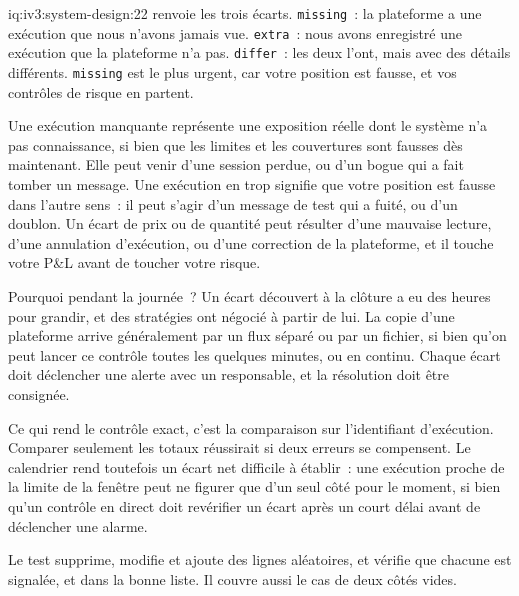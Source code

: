 \begin{solution}{iq:iv3:system-design:22}
 renvoie les trois écarts. \texttt{missing}~: la plateforme a une exécution que nous n'avons jamais vue. \texttt{extra}~: nous avons enregistré une exécution que la plateforme n'a pas. \texttt{differ}~: les deux l'ont, mais avec des détails différents. \texttt{missing} est le plus urgent, car votre position est fausse, et vos contrôles de risque en partent.
\label{lst:iv3:sd:recon}

Une exécution manquante représente une exposition réelle dont le système n'a pas connaissance, si bien que les limites et les couvertures sont fausses dès maintenant. Elle peut venir d'une session perdue, ou d'un bogue qui a fait tomber un message. Une exécution en trop signifie que votre position est fausse dans l'autre sens~: il peut s'agir d'un message de test qui a fuité, ou d'un doublon. Un écart de prix ou de quantité peut résulter d'une mauvaise lecture, d'une annulation d'exécution, ou d'une correction de la plateforme, et il touche votre P\&L avant de toucher votre risque.

Pourquoi pendant la journée~? Un écart découvert à la clôture a eu des heures pour grandir, et des stratégies ont négocié à partir de lui. La copie d'une plateforme arrive généralement par un flux séparé ou par un fichier, si bien qu'on peut lancer ce contrôle toutes les quelques minutes, ou en continu. Chaque écart doit déclencher une alerte avec un responsable, et la résolution doit être consignée.

Ce qui rend le contrôle exact, c'est la comparaison sur l'identifiant d'exécution. Comparer seulement les totaux réussirait si deux erreurs se compensent. Le calendrier rend toutefois un écart net difficile à établir~: une exécution proche de la limite de la fenêtre peut ne figurer que d'un seul côté pour le moment, si bien qu'un contrôle en direct doit revérifier un écart après un court délai avant de déclencher une alarme.

Le test supprime, modifie et ajoute des lignes aléatoires, et vérifie que chacune est signalée, et dans la bonne liste. Il couvre aussi le cas de deux côtés vides.

\end{solution}

